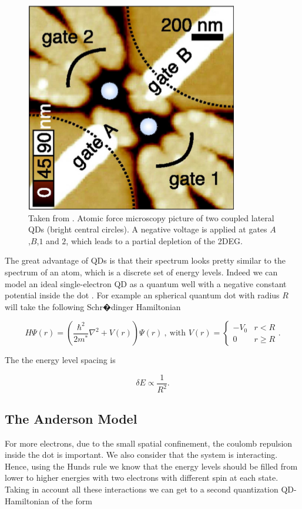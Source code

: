 \begin{figure}[h]
\centering
\includegraphics[scale=0.55]{IMAGES/QD-horizontal.png}\caption{Taken from \citep{holleitner_probing_2002}. Atomic force microscopy
picture of two coupled lateral QDs (bright central circles). A negative
voltage is applied at gates $A$,$B$,$1$ and $2$, which leads to
a partial depletion of the 2DEG.\label{QD}}
\end{figure}


The great advantage of QDs is that their spectrum looks pretty similar
to the spectrum of an atom, which is a discrete set of energy levels.
Indeed we can model an ideal single-electron QD as a quantum well
with a negative constant potential inside the dot . For example an
spherical quantum dot with radius $R$ will take the following Schr�dinger
Hamiltonian 

\[
H\Psi(r)=\left(\frac{\hbar^{2}}{2m^{*}}\nabla^{2}+V(r)\right)\Psi(r)\ ,\ \textrm{with }V(r)=\begin{cases}
-V_{0} & r<R\\
0 & r\geq R
\end{cases}.
\]


The 
the energy level spacing is  \citep[Equation (5.44)]{bimberg_quantum_1999}

\[
\delta E\propto\frac{1}{R^{2}}.
\]



\subsection{The Anderson Model}

For more electrons, due to the small spatial confinement, the coulomb
repulsion inside the dot is important. We also consider that the system is interacting. Hence, using the Hunds rule we know that
the energy levels should be filled from lower to higher energies with
two electrons with different spin at each state. Taking in account
all these interactions we can get to a second quantization QD-Hamiltonian
of the form \citep[(3.2)]{sindel_numerical_2005}

